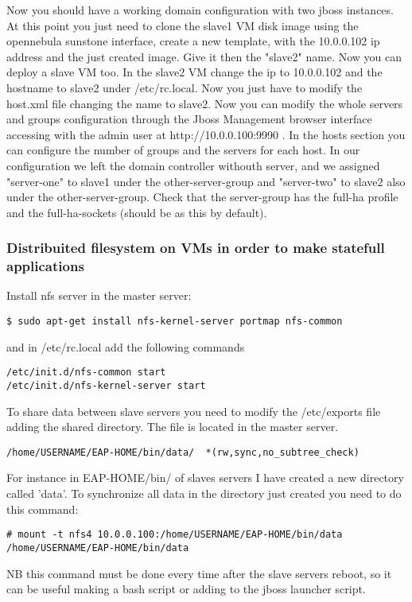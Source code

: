 \documentclass[11pt,a4paper]{article}
\begin{document}
Now you should have a working domain configuration with two jboss instances. At this point you just need to clone the slave1 VM disk image using the opennebula sunstone interface, create a new template, with the 10.0.0.102 ip address and the just created image. Give it then the "slave2" name. Now you can deploy a slave VM too. In the slave2 VM change the ip to 10.0.0.102 and the hostname to slave2 under /etc/rc.local. Now you just have to modify the host.xml file changing the name to slave2. Now you can modify the whole servers and groups configuration through the Jboss Management browser interface accessing with the admin user at http://10.0.0.100:9990 . In the hosts section you can configure the number of groups and the servers for each host. In our configuration we left the domain controller withouth server, and we assigned "server-one" to slave1 under the other-server-group and "server-two" to slave2 also under the other-server-group. Check that the server-group has the full-ha profile and the full-ha-sockets (should be as this by default).


\subsubsection{Distribuited filesystem on VMs in order to make statefull applications}

Install nfs server in the master server:
\begin{lstlisting}
$ sudo apt-get install nfs-kernel-server portmap nfs-common
\end{lstlisting}
and in /etc/rc.local add the following commands

\begin{lstlisting}
/etc/init.d/nfs-common start
/etc/init.d/nfs-kernel-server start
\end{lstlisting}

To share data between slave servers you need to modify the /etc/exports file adding the shared directory. The file is located in the master server.
\begin{lstlisting}
/home/USERNAME/EAP-HOME/bin/data/  *(rw,sync,no_subtree_check)
\end{lstlisting}


For instance in EAP-HOME/bin/ of slaves servers I have created a new directory called 'data'. 
To synchronize all data in the directory just created you need to do this command:
\begin{lstlisting}
# mount -t nfs4 10.0.0.100:/home/USERNAME/EAP-HOME/bin/data /home/USERNAME/EAP-HOME/bin/data
\end{lstlisting}
NB this command must be done every time after the slave servers reboot, so it can be useful making a bash script or adding to the jboss launcher script.
\end{document}
